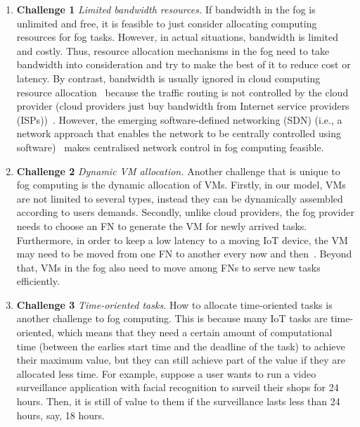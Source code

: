 \documentclass[11pt]{phdthesis}
\begin{document}

\begin{enumerate}
	
	\item \label{itm: Challenge bandwidth} \textbf{Challenge 1} \textit{Limited bandwidth resources.} If bandwidth in the fog is unlimited and free, it is feasible to just consider allocating computing resources for fog tasks. However, in actual situations, bandwidth is limited and costly. Thus, resource allocation mechanisms in the fog need to take bandwidth into consideration and try to make the best of it to reduce cost or latency. By contrast, bandwidth is usually ignored in cloud computing resource allocation~\citep{shi2016online} because the traffic routing is not controlled by the cloud provider (cloud providers just buy bandwidth from Internet service providers (ISPs))~\citep{kuster2012cloud}. However, the emerging software-defined networking (SDN) (i.e., a network approach that enables the network to be centrally controlled using software)~\citep{kreutz2015software} makes centralised network control in fog computing feasible.
	
	\item \label{itm: Challenge VM} \textbf{Challenge 2} \textit{Dynamic VM allocation.} Another challenge that is unique to fog computing is the dynamic allocation of VMs. Firstly, in our model, VMs are not limited to several types, instead they can be dynamically assembled according to users demands. Secondly, unlike cloud providers, the fog provider needs to choose an FN to generate the VM for newly arrived tasks. Furthermore, in order to keep a low latency to a moving IoT device, the VM may need to be moved from one FN to another every now and then~\citep{bittencourt2015towards}. Beyond that, VMs in the fog also need to move among FNs to serve new tasks efficiently. 
	
	\item \label{itm: Challenge time-oriented} \textbf{Challenge 3} \textit{Time-oriented tasks.} How to allocate time-oriented tasks is another challenge to fog computing. This is because many IoT tasks are time-oriented, which means that they need a certain amount of computational time (between the earlies start time and the deadline of the task) to achieve their maximum value, but they can still achieve part of the value if they are allocated less time. For example, suppose a user wants to run a video surveillance application with facial recognition to surveil their shops for 24 hours. Then, it is still of value to them if the surveillance lasts less than 24 hours, say, 18 hours.
	

\end{enumerate}
\end{document}

